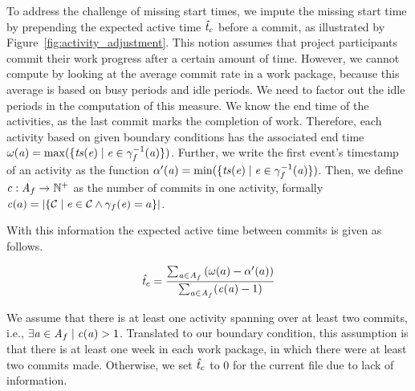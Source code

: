 To address the challenge of missing start times, we impute the missing start time by prepending the expected active time $\mathit{\hat{t}_{c}}$ before a commit, as illustrated by Figure~\ref{fig:activity_adjustment}. This notion assumes that project participants commit their work progress after a certain amount of time. However, we cannot compute \expectedActiveTime by looking at the average commit rate in a work package, because this average is based on busy periods and idle periods. We need to factor out the idle periods in the computation of this measure.
We know the end time of the activities, as the last commit marks the completion of work. Therefore, each activity \activity based on given boundary conditions has the associated end time $\omega(\mathit{a}) = \max(\lbrace \mathit{ts}(\mathit{e}) \mid \mathit{e} \in \gamma_{f}^{-1}(\mathit{a})  \rbrace)$. Further, we write the first event's timestamp of an activity as the function $\alpha'(\mathit{a}) = \min(\lbrace \mathit{ts}(\mathit{e}) \mid \mathit{e} \in \gamma_{f}^{-1}(\mathit{a})  \rbrace)$.
Then, we define $\mathit{c}:\mathit{A}_{f} \rightarrow \mathbb{N^+}$ as the number of commits in one activity, formally $\mathit{c}(a)=|\lbrace \mathcal{C} \mid \mathit{e} \in \mathcal{C} \wedge \gamma_{f}(\mathit{e})=a\rbrace |$.

With this information the expected active time between commits \expectedActiveTime is given as follows.

\begin{equation}
	\mathit{\hat{t}_{c}} = \frac{\sum_{\mathit{a} \in \mathit{A}_{f}} \left(\omega(a) - \alpha'(a)\right)}{\sum_{\mathit{a} \in \mathit{A}_{f}} (\mathit{c}(\mathit{a})-1) }
\end{equation}

We assume that there is at least one activity spanning over at least two commits, i.e., $\exists \mathit{a} \in \mathit{A}_{f} \mid \mathit{c}(\mathit{a}) > 1 $. Translated to our boundary condition, this assumption is that there is at least one week in each work package, in which there were at least two commits made. Otherwise, we set $\mathit{\hat{t}_{c}}$ to 0 for the current file \file due to lack of information.

